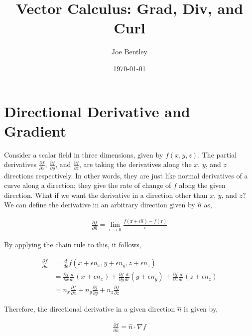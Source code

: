 \documentclass[11pt]{amsart}
\title{Vector Calculus: Grad, Div, and Curl}
\author{Joe Bentley}
\date{\today}
\begin{document}
\maketitle

\newpage

\section{Directional Derivative and Gradient}

Consider a scalar field in three dimensions, given by $f(x, y, z)$. The partial derivatives $\frac{\partial f}{\partial x}$, $\frac{\partial f}{\partial y}$, and $\frac{\partial f}{\partial z}$, are taking the derivatives along the $x$, $y$, and $z$ directions respectively. In other words, they are just like normal derivatives of a curve along a direction; they give the rate of change of $f$ along the given direction. What if we want the derivative in a direction other than $x$, $y$, and $z$? We can define the derivative in an arbitrary direction given by $\hat{n}$ as,

\begin{align*}
  \frac{\partial f}{\partial \hat{n}} = \lim_{\epsilon \to 0} \frac{f(\mathbf{r} + \epsilon \hat{n}) - f(\mathbf{r})}{\epsilon}
\end{align*}

By applying the chain rule to this, it follows,

\begin{align*}
  \frac{\partial f}{\partial \hat{n}} &= \frac{d}{d\epsilon} f(x + \epsilon n_x, y + \epsilon n_y, z + \epsilon n_z) \\
                                      &= \frac{\partial f}{\partial x} \frac{d}{d\epsilon} (x + \epsilon n_x)
                                       + \frac{\partial f}{\partial y} \frac{d}{d\epsilon} (y + \epsilon n_y)
                                       + \frac{\partial f}{\partial z} \frac{d}{d\epsilon} (z + \epsilon n_z) \\
                                      &= n_x \frac{\partial f}{\partial x} + n_y \frac{\partial f}{\partial y} + n_z \frac{\partial f}{\partial z}
\end{align*}

Therefore, the directional derivative in a given direction $\hat{n}$ is given by,

\begin{align*}
  \frac{\partial f}{\partial \hat{n}} = \hat{n} \cdot \nabla f
\end{align*}
\end{document}
